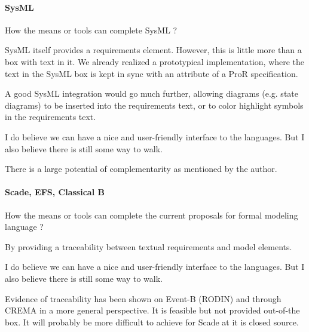 \paragraph{SysML}
How the means or tools can complete SysML ?

\begin{author_comment}
SysML itself provides a requirements element.  However, this is little more than a box with text in it.  We already realized a prototypical implementation, where the text in the SysML box is kept in sync with an attribute of a ProR specification.

A good SysML integration would go much further, allowing diagrams (e.g. state diagrams) to be inserted into the requirements text, or to color highlight symbols in the requirements text.
\end{author_comment}

\begin{assessor1}
I do believe we can have a nice and user-friendly interface to the languages. But I also believe there is still some way to walk. 
\end{assessor1}

\begin{assessor2}
There is a large potential of complementarity as mentioned by the author.
\end{assessor2}

\paragraph{Scade, EFS, Classical B}
How the means or tools can complete the current proposals for formal modeling language ?

\begin{author_comment}
By providing a traceability between textual requirements and model elements.
\end{author_comment}

\begin{assessor1}
I do believe we can have a nice and user-friendly interface to the languages. But I also believe there is still some way to walk. 
\end{assessor1}

\begin{assessor2}
Evidence of traceability has been shown on Event-B (RODIN) and through CREMA in a more general perspective. It is feasible but not provided out-of-the box. It will probably be more difficult to achieve for Scade at it is closed source.
\end{assessor2}

